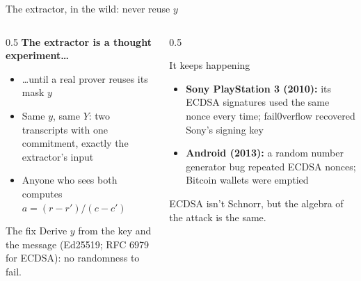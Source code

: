 \ifdefined\PRESENTATION\else\PassOptionsToClass{handout}{beamer}\fi\documentclass[aspectratio=169, lualatex]{beamer}
\begin{document}
\begin{frame}{The extractor, in the wild: never reuse $y$}
	\begin{columns}[c]
		\begin{column}{0.5\textwidth}
			\textbf{The extractor is a thought experiment\ldots}
			\begin{itemize}
				\item \ldots until a real prover reuses its mask $y$
				\item Same $y$, same $Y$: two transcripts with one commitment, exactly the extractor's input
				\item Anyone who sees both computes $a = (r - r')/(c - c')$
			\end{itemize}
			\begin{exampleblock}{The fix}
				Derive $y$ from the key and the message (Ed25519; RFC 6979 for ECDSA): no randomness to fail.
			\end{exampleblock}
		\end{column}
		\begin{column}{0.5\textwidth}
			\begin{alertblock}{It keeps happening}
				\begin{itemize}
					\item \textbf{Sony PlayStation 3 (2010):} its ECDSA signatures used the same nonce every time; fail0verflow recovered Sony's signing key
					\item \textbf{Android (2013):} a random number generator bug repeated ECDSA nonces; Bitcoin wallets were emptied
				\end{itemize}
				ECDSA isn't Schnorr, but the algebra of the attack is the same.
			\end{alertblock}
		\end{column}
	\end{columns}
\end{frame}
\end{document}
